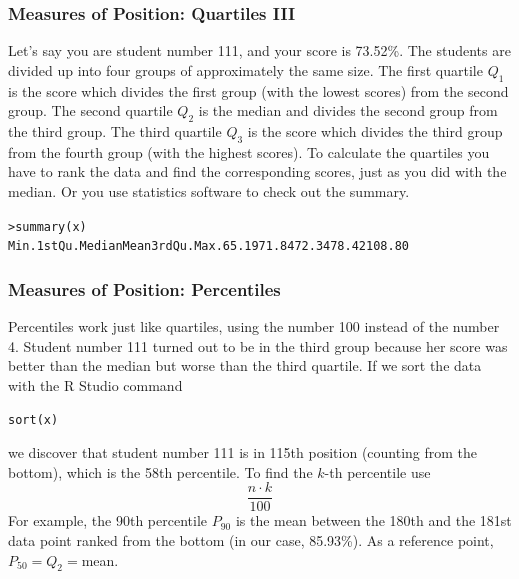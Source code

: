 \documentclass[xcolor=dvipsnames]{beamer}
\begin{document}
\begin{frame}
  \frametitle{Measures of Position: Quartiles III}
  Let's say you are student number 111, and your score is 73.52\%. The
  students are divided up into four groups of approximately the same
  size. The first quartile $Q_{1}$ is the score which divides the
  first group (with the lowest scores) from the second group. The
  second quartile $Q_{2}$ is the median and divides the second group
  from the third group. The third quartile $Q_{3}$ is the score which divides the
  third group from the fourth group (with the highest scores). To
  calculate the quartiles you have to rank the data and find the
  corresponding scores, just as you did with the median. Or you use
  statistics software to check out the summary.
\begin{alltt}
> summary(x)\newline
   Min. 1st Qu.  Median    Mean 3rd Qu.    Max.    65.19   71.84   72.34   78.42  108.80 
\end{alltt}
\end{frame}

\begin{frame}
  \frametitle{Measures of Position: Percentiles}
Percentiles work just like quartiles, using the number 100 instead of
the number 4. Student number 111 turned out to be in the third
group because her score was better than the median but worse than the
third quartile. If we sort the data with the R Studio command
\begin{alltt}
sort(x)
\end{alltt}
we discover that student number 111 is in 115th position (counting
from the bottom), which is the 58th percentile. To find the $k$-th
percentile use
\begin{equation}
  \label{eq:phaecoab}
  \frac{n\cdot{}k}{100}
\end{equation}
For example, the 90th percentile $P_{90}$ is the mean between the 180th and the
181st data point ranked from the bottom (in our case, 85.93\%). As a
reference point, $P_{50}=Q_{2}=$mean.
\end{frame}
\end{document}
